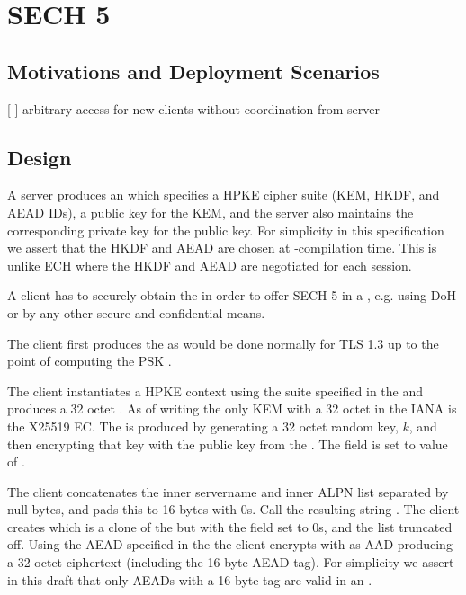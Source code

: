 \section{SECH 5}
\subsection{Motivations and Deployment Scenarios}

[ ] arbitrary access for new clients without coordination from server

\subsection{Design}

A server produces an  which specifies a \ac{HPKE} cipher suite
(\ac{KEM}, \ac{HKDF}, and \ac{AEAD} IDs),
a public key for the \ac{KEM}, and the server
also maintains the corresponding private key for the public key.
For simplicity in this specification we assert that the \ac{HKDF}
and \ac{AEAD} are chosen at -compilation time.
This is unlike \ac{ECH} where the \ac{HKDF} and \ac{AEAD} are
negotiated for each session.

A client has to securely obtain the  in order to offer \ac{SECH} 5 in a , e.g. using \ac{DoH} or by any other secure and confidential means.

The client first produces the  as would be done normally
for \ac{TLS} 1.3 up to the point of computing the \ac{PSK} .

The client instantiates a \ac{HPKE} context using the suite specified in
the  and produces a 32 octet .
As of writing the only \ac{KEM} with a 32 octet  in the \ac{IANA} is
the \ac{X25519} \ac{EC}.
The  is produced by generating a 32 octet random key, $k$, and then encrypting
that key with the public key from the .
The  field is set to value of .

The client concatenates the inner servername and inner \ac{ALPN} list separated by null bytes, and pads this to 16 bytes with 0s. Call the resulting string .
The client creates  which is a clone
of the  but with the  field set to 0s,
and the  list truncated off.
Using the \ac{AEAD} specified in the  the client encrypts
 with  as \ac{AAD}
producing a 32 octet ciphertext 
(including the 16 byte \ac{AEAD} tag). 
For simplicity we assert in this draft that only \ac{AEAD}s with a 16 byte tag are valid in an .

